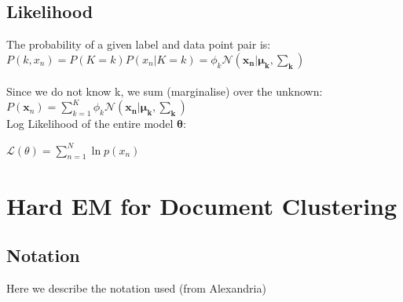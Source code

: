 \documentclass[a4paper]{article}
\begin{document}
	\subsection{Likelihood}
	The probability of a given label and data point pair is: \\
	$P(k, x_n) = P(K=k)P(x_n | K=k) = \phi_k \mathcal{N}(\mathbf{x_n | \mu_k, \sum_k})$ \\ \\
	Since we do not know k, we sum (marginalise) over the unknown: \\
	$P(\mathbf{x}_n) = \sum_{k=1}^{K}\phi_k \mathcal{N}(\mathbf{x_n| \mu_k, \sum_k})$ \\
	
	Log Likelihood of the entire model $\mathbf{\theta}$:
	
	$\mathcal{L}(\theta) = \sum_{n=1}^N\ln p(x_n)$
	
	
	\section{Hard EM for Document Clustering}
	
	\subsection{Notation}
	
	Here we describe the notation used (from Alexandria)
	
\end{document}
